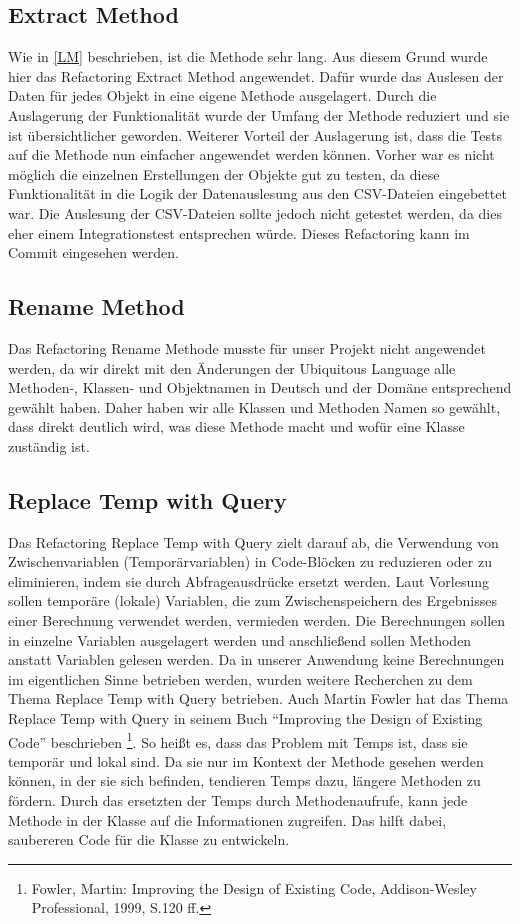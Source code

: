 \subsection{Extract Method}
Wie in \autoref{LM} beschrieben, ist die Methode  sehr lang. Aus diesem Grund wurde hier das Refactoring Extract Method angewendet. Dafür wurde das Auslesen der Daten für jedes Objekt in eine eigene Methode ausgelagert.
Durch die Auslagerung der Funktionalität wurde der Umfang der Methode reduziert und sie ist übersichtlicher geworden. 
Weiterer Vorteil der Auslagerung ist, dass die Tests auf die Methode nun einfacher angewendet werden können. Vorher war es nicht möglich die einzelnen Erstellungen der Objekte gut zu testen, da diese Funktionalität in die Logik der Datenauslesung aus den CSV-Dateien eingebettet war. Die Auslesung der CSV-Dateien sollte jedoch nicht getestet werden, da dies eher einem Integrationstest entsprechen würde.
Dieses Refactoring kann im Commit \href{https://github.com/MichaelaHaag/RezeptApp/commit/d3ace6a38e46831cee35d0b270c41c4fd5783162}{} eingesehen werden.

\subsection{Rename Method}
Das Refactoring Rename Methode musste für unser Projekt nicht angewendet werden, da wir direkt mit den Änderungen der Ubiquitous Language alle Methoden-, Klassen- und Objektnamen in Deutsch und der Domäne entsprechend gewählt haben. Daher haben wir alle Klassen und Methoden Namen so gewählt, dass direkt deutlich wird, was diese Methode macht und wofür eine Klasse zuständig ist.

\subsection{Replace Temp with Query}
Das Refactoring Replace Temp with Query zielt darauf ab, die Verwendung von Zwischenvariablen (Temporärvariablen) in Code-Blöcken zu reduzieren oder zu eliminieren, indem sie durch Abfrageausdrücke ersetzt werden. 
Laut Vorlesung sollen temporäre (lokale) Variablen, die zum Zwischenspeichern des Ergebnisses einer Berechnung verwendet werden, vermieden werden. Die Berechnungen sollen in einzelne Variablen ausgelagert werden und anschließend sollen Methoden anstatt Variablen gelesen werden. 
Da in unserer Anwendung keine Berechnungen im eigentlichen Sinne betrieben werden, wurden weitere Recherchen zu dem Thema Replace Temp with Query betrieben. Auch Martin Fowler hat das Thema Replace Temp with Query in seinem Buch \enquote{Improving the Design of Existing Code} beschrieben \footnote[1]{Fowler, Martin: Improving the Design of Existing Code, Addison-Wesley Professional, 1999, S.120 ff.}. So heißt es, dass das Problem mit Temps ist, dass sie temporär und lokal sind. Da sie nur im Kontext der Methode gesehen werden können, in der sie sich befinden, tendieren Temps dazu, längere Methoden zu fördern. Durch das ersetzten der Temps durch Methodenaufrufe, kann jede Methode in der Klasse auf die Informationen zugreifen. Das hilft dabei, saubereren Code für die Klasse zu entwickeln.

